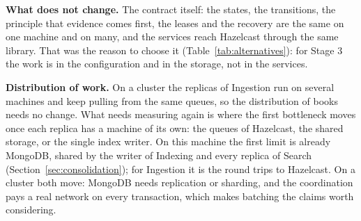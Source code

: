 \textbf{What does not change.} The contract itself: the states, the transitions, the principle that evidence comes
first, the leases and the recovery are the same on one machine and on many, and the services reach Hazelcast through the
same library. That was the reason to choose it (Table~\ref{tab:alternatives}): for Stage 3 the work is in the
configuration and in the storage, not in the services.

\textbf{Distribution of work.} On a cluster the replicas of Ingestion run on several machines and keep pulling from the
same queues, so the distribution of books needs no change. What needs measuring again is where the first bottleneck moves
once each replica has a machine of its own: the queues of Hazelcast, the shared storage, or the single index writer.
On this machine the first limit is already MongoDB, shared by the writer of Indexing and every replica of Search
(Section~\ref{sec:consolidation}); for Ingestion it is the round trips to Hazelcast. On a cluster both move: MongoDB
needs replication or sharding, and the coordination pays a real network on every transaction, which makes batching the
claims worth considering.
